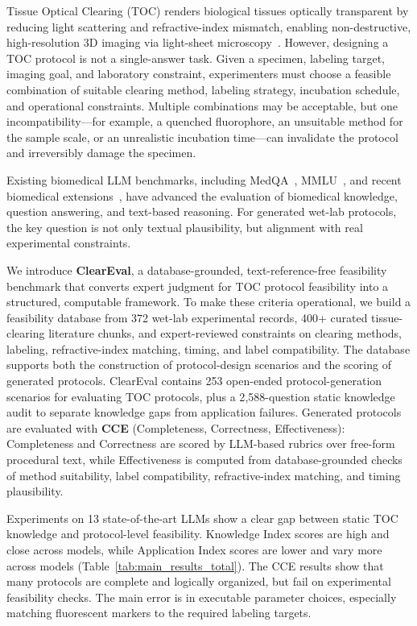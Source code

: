 \documentclass[conference]{IEEEtran}
\begin{document}
Tissue Optical Clearing (TOC) renders biological tissues optically transparent
by reducing light scattering and refractive-index mismatch, enabling
non-destructive, high-resolution 3D imaging via light-sheet
microscopy~\cite{ueda2020tissue,chung2013clarity}. However, designing a TOC
protocol is not a single-answer task. Given a specimen, labeling target,
imaging goal, and laboratory constraint, experimenters must choose a feasible
combination of suitable clearing method, labeling strategy, incubation schedule, 
and operational constraints. Multiple combinations may be acceptable, but one incompatibility---for example, a
quenched fluorophore, an unsuitable method for the sample scale, or an
unrealistic incubation time---can invalidate the protocol and irreversibly
damage the specimen.

Existing biomedical LLM benchmarks, including MedQA~\cite{jin2021disease},
MMLU~\cite{hendrycks2021mmlu}, and recent biomedical
extensions~\cite{zhang2025benchmarking,wang2025cardbiomedbench,feng2024mediq},
have advanced the evaluation of biomedical knowledge, question answering, and
text-based reasoning. For generated wet-lab protocols, the key question is not only textual plausibility, 
but alignment with real experimental constraints. 

We introduce \textbf{ClearEval}, a database-grounded, text-reference-free
feasibility benchmark that converts expert judgment for TOC protocol feasibility
into a structured, computable framework. To make these criteria operational,
we build a feasibility database from 372 wet-lab experimental records,
400+ curated tissue-clearing literature chunks, and expert-reviewed constraints
on clearing methods, labeling, refractive-index matching, timing, and
label compatibility. The database supports both the construction of protocol-design
scenarios and the scoring of generated protocols. ClearEval contains 253
open-ended protocol-generation scenarios for evaluating TOC protocols, plus a
2{,}588-question static knowledge audit to separate knowledge gaps from
application failures. Generated protocols are evaluated with \textbf{CCE}
(Completeness, Correctness, Effectiveness): Completeness and Correctness are
scored by LLM-based rubrics over free-form procedural text, while Effectiveness
is computed from database-grounded checks of method suitability, label
compatibility, refractive-index matching, and timing plausibility.

Experiments on 13 state-of-the-art LLMs show a clear gap between static TOC
knowledge and protocol-level feasibility. Knowledge Index scores are high and
close across models, while Application Index scores are lower and vary more
across models (Table~\ref{tab:main_results_total}). The CCE results show that
many protocols are complete and logically organized, but fail on experimental
feasibility checks. The main error is in executable parameter choices,
especially matching fluorescent markers to the required labeling targets.
\end{document}
